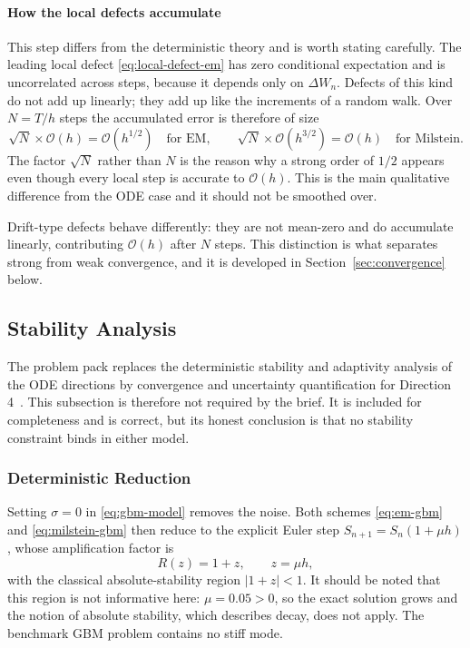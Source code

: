 \documentclass[11pt,a4paper]{article}
\theoremstyle{definition}
\theoremstyle{remark}
\begin{document}
\paragraph{How the local defects accumulate}
This step differs from the deterministic theory and is worth stating carefully.
The leading local defect \eqref{eq:local-defect-em} has zero conditional
expectation and is uncorrelated across steps, because it depends only on
$\Delta W_n$. Defects of this kind do not add up linearly; they add up like the
increments of a random walk. Over $N = T/h$ steps the accumulated error is
therefore of size
\begin{equation}
    \sqrt{N} \times \mathcal{O}(h) = \mathcal{O}\!\left( h^{1/2} \right)
    \quad \text{for EM},
    \qquad
    \sqrt{N} \times \mathcal{O}(h^{3/2}) = \mathcal{O}(h)
    \quad \text{for Milstein}.
    \label{eq:accumulation}
\end{equation}
The factor $\sqrt{N}$ rather than $N$ is the reason why a strong order of $1/2$
appears even though every local step is accurate to $\mathcal{O}(h)$. This is
the main qualitative difference from the ODE case and it should not be smoothed
over.

Drift-type defects behave differently: they are not mean-zero and do accumulate
linearly, contributing $\mathcal{O}(h)$ after $N$ steps. This distinction is
what separates strong from weak convergence, and it is developed in
Section~\ref{sec:convergence} below.

\subsection{Stability Analysis}
\label{sec:ms-stability}

The problem pack replaces the deterministic stability and adaptivity analysis
of the ODE directions by convergence and uncertainty quantification for
Direction 4~\cite{kloeden,higham}. This subsection is therefore not required by
the brief. It is included for completeness and is correct, but its honest
conclusion is that no stability constraint binds in either model.

\subsubsection{Deterministic Reduction}

Setting $\sigma = 0$ in \eqref{eq:gbm-model} removes the noise. Both schemes
\eqref{eq:em-gbm} and \eqref{eq:milstein-gbm} then reduce to the explicit Euler
step $S_{n+1} = S_n (1 + \mu h)$, whose amplification factor is
\begin{equation}
    R(z) = 1 + z, \qquad z = \mu h,
    \label{eq:R-euler}
\end{equation}
with the classical absolute-stability region $|1 + z| < 1$. It should be noted
that this region is not informative here: $\mu = 0.05 > 0$, so the exact
solution grows and the notion of absolute stability, which describes decay,
does not apply. The benchmark GBM problem contains no stiff mode.
\end{document}

